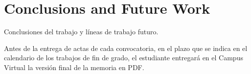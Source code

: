 \chapter{Conclusions and Future Work}
\label{cap:conclusiones}

Conclusiones del trabajo y líneas de trabajo futuro.

Antes de la entrega de actas de cada convocatoria, en el plazo que se indica en el calendario de los trabajos de fin de grado, el estudiante entregará en el Campus Virtual la versión final de la memoria en PDF.


